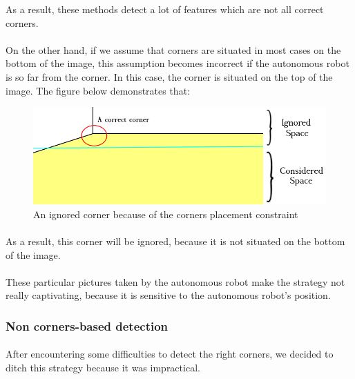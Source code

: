 \documentclass[12pt]{report}
\begin{document}
	 As a result, these methods detect a lot of features which are not all correct corners.
	 
	 \paragraph{}
	 On the other hand, if we assume that corners are situated in most cases on the bottom of the image, this assumption becomes incorrect if the autonomous robot is so far from the corner. In this case, the corner is situated on the top of the image. The figure below demonstrates that:
	 	\begin{figure}[H]
	 	\begin{center}
	 		\includegraphics[scale=0.6]{res/start1_c1.png}
	 		\caption{An ignored corner because of the corners placement constraint}
	 	\end{center}
	 \end{figure}
	 \paragraph{}
	 As a result, this corner will be ignored, because it is not situated on the bottom of the image.
	 
	 \paragraph{}
	 These particular pictures taken by the autonomous robot make the strategy not really captivating, because it is sensitive to the autonomous robot's position.
	 
	 \subsubsection{Non corners-based detection}
	 \paragraph{}
	 After encountering some difficulties to detect the right corners, we decided to ditch this strategy because it was impractical. 
	 
\end{document}
